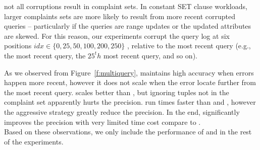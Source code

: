 not all corruptions result in complaint sets.
In constant SET clause workloads, larger complaints sets are more likely to
result from more recent corrupted queries -- particularly if the queries are range updates or
the updated attributes are skewed.
For this reason, our experiments corrupt the query log at six positions 
$idx \in \{0, 25, 50, 100, 200, 250\}$ , relative 
to the most recent query (e.g., the most recent query, the $25^th$ most recent query, and so on).



As we observed from Figure~\ref{f:multiquery}, \milpall maintains high accuracy when errors
happen more recent, however it does not scale when the error locate further from the most
recent query. \milptuple scales better than \milpall, but ignoring tuples not 
in the complaint set apparently hurts the precision. \milptuplestopearly run times faster
than \milpall and \milptuple, however the aggressive strategy greatly reduce the 
precision. In the end, \milpadvtuple significantly improves the precision with very limited
time cost compare to \milptuple. \\
Based on these observations, we only include the performance of \milpadvtuple and \milpadvall
in the rest of the experiments. 

